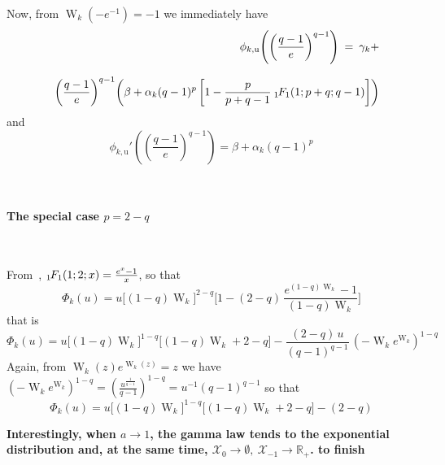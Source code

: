\documentclass[entropy,article,submit,moreauthors,pdftex]{Definitions/mdpi}
\newcommand{\Avoir}[1]{{\color{red}\bf #1}}                                  %
\def\Rset{\mathbb{R}}%
\def\X{\mathcal{X}}%
\def\W{\operatorname{W}} %
\newcommand{\hypgeom}[2]{\mbox{}_{#1}\hspace{-1pt}F_{#2}}%
\def\u{\mathrm{u}}
\begin{document}
\

Now, from $\W_k(-e^{-1}) = -1$ we immediately have
%
\begin{eqnarray}
%
&&  \phi_{k,\u}\left( \left( \frac{q-1}{e} \right)^{q-1} \right) \: = \: \gamma_k + \nonumber\\[2.5mm]
  & & \left(
\frac{q-1}{e}  \right)^{q-1} \left(  \beta  +  \alpha_k (q-1)^p  \,  \left[ 1  -
  \frac{p}{p+q-1} \: \hypgeom{1}{1}\left( 1 ; p+q ; q-1 \right) \right] \right)
%
\end{eqnarray}
%
and
%
\begin{equation}
\phi_{k,\u}'\left( \left( \frac{q-1}{e} \right)^{q-1}  \right) =\beta + \alpha_k (q-1)^p
\end{equation}


\

\paragraph{\bf The special case $p = 2-q$}

\

From~\cite[13.6.14]{AbrSte70}, $\hypgeom{1}{1}(1 ; 2 ; x) = \frac{e^x - 1}{x}$, so that
%
\[
\Phi_k(u) = u \Big[ (1-q) \W_k \Big]^{2-q} \Big[ 1 - (2-q) \, \frac{e^{(1-q) \W_k} - 1}{(1-q) \W_k} \Big]
\]
%
that is
%
\[
\Phi_k(u) = u \Big[ (1-q) \W_k \Big]^{1-q} \Big[ (1-q) \W_k + 2 - q \Big] - \frac{(2-q) \, u}{(q-1)^{q-1}} \, \left( - \W_k e^{\W_k} \right)^{1-q}
\]
%
Again,  from  $\W_k(z)  e^{\W_k(z)}  =  z$  we  have  $\left(  -  \W_k  e^{\W_k}
\right)^{1-q}  =  \left(  \frac{u^{\frac{1}{q-1}}}{q-1} \right)^{1-q}  =  u^{-1}
(q-1)^{q-1}$ so that
%
\[
\Phi_k(u) = u \Big[ (1-q) \W_k \Big]^{1-q} \Big[ (1-q) \W_k + 2 - q \Big] - (2-q)
\]

\centerline{\underline{\hspace{15cm}}}


\Avoir{Interestingly, when  $a \to 1$,  the gamma  law tends to  the exponential
  distribution  and, at  the  same time,  $\X_0 \to  \emptyset,  \: \X_{-1}  \to
  \Rset_+$. to finish}

\
\end{document}
